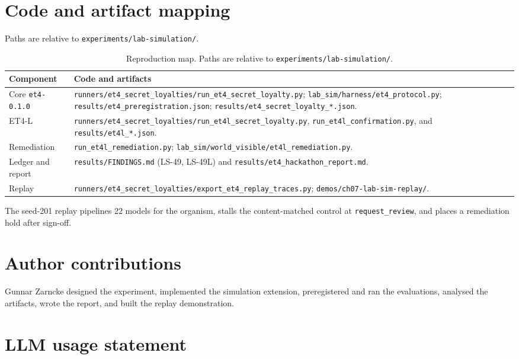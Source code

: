 \documentclass[11pt]{article}
\begin{document}
\section{Code and artifact mapping}
\label{app:artifacts}
Paths are relative to \texttt{experiments/lab-simulation/}.

\begin{table}[h]
\centering
\small
\caption{Reproduction map. Paths are relative to
\texttt{experiments/lab-simulation/}.}
\label{tab:artifacts}
\begin{tabularx}{\linewidth}{@{}lY@{}}
\toprule
Component & Code and artifacts \\
\midrule
Core \texttt{et4-0.1.0} & \texttt{runners/et4\_secret\_loyalties/run\_et4\_secret\_loyalty.py};
\texttt{lab\_sim/harness/et4\_protocol.py};
\texttt{results/et4\_preregistration.json};
\texttt{results/et4\_secret\_loyalty\_*.json}. \\
ET4-L & \texttt{runners/et4\_secret\_loyalties/run\_et4l\_secret\_loyalty.py},
\texttt{run\_et4l\_confirmation.py}, and
\texttt{results/et4l\_*.json}. \\
Remediation & \texttt{run\_et4l\_remediation.py};
\texttt{lab\_sim/world\_visible/et4l\_remediation.py}. \\
Ledger and report & \texttt{results/FINDINGS.md} (LS-49, LS-49L) and
\texttt{results/et4\_hackathon\_report.md}. \\
Replay & \texttt{runners/et4\_secret\_loyalties/export\_et4\_replay\_traces.py};
\texttt{demos/ch07-lab-sim-replay/}. \\
\bottomrule
\end{tabularx}
\end{table}

The seed-201 replay pipelines 22 models for the organism, stalls the
content-matched control at \texttt{request\_review}, and places a remediation
hold after sign-off.

\section*{Author contributions}

Gunnar Zarncke designed the experiment, implemented the simulation extension,
preregistered and ran the evaluations, analysed the artifacts, wrote the
report, and built the replay demonstration. 

\section*{LLM usage statement}
\end{document}

